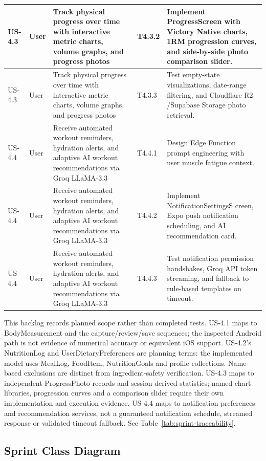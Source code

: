 \documentclass[12pt,a4paper,openany]{report}
\begin{document}
\begin{longtable}{|L{1.20cm}|L{2.00cm}|L{5.40cm}|L{1.80cm}|L{4.00cm}|}
US-4.3 & User & Track physical progress over time with interactive metric charts, volume graphs, and progress photos & T4.3.2 & Implement ProgressScreen with Victory Native charts, 1RM progression curves, and side-by-side photo comparison slider. \\ \hline
US-4.3 & User & Track physical progress over time with interactive metric charts, volume graphs, and progress photos & T4.3.3 & Test empty-state visualizations, date-range filtering, and Cloudflare R2 /Supabase Storage photo retrieval. \\ \hline
US-4.4 & User & Receive automated workout reminders, hydration alerts, and adaptive AI workout recommendations via Groq LLaMA-3.3 & T4.4.1 & Design Edge Function  prompt engineering with user muscle fatigue context. \\ \hline
US-4.4 & User & Receive automated workout reminders, hydration alerts, and adaptive AI workout recommendations via Groq LLaMA-3.3 & T4.4.2 & Implement NotificationSettingsS creen, Expo push notification scheduling, and AI recommendation card. \\ \hline
US-4.4 & User & Receive automated workout reminders, hydration alerts, and adaptive AI workout recommendations via Groq LLaMA-3.3 & T4.4.3 & Test notification permission handshakes, Groq API token streaming, and fallback to rule-based templates on timeout. \\ \hline
\end{longtable}
\endgroup

This backlog records planned scope rather than completed tests. US-4.1 maps to BodyMeasurement and the capture/review/save sequences; the inspected Android path is not evidence of numerical accuracy or equivalent iOS support. US-4.2's NutritionLog and UserDietaryPreferences are planning terms: the implemented model uses MealLog, FoodItem, NutritionGoals and profile collections. Name-based exclusions are distinct from ingredient-safety verification. US-4.3 maps to independent ProgressPhoto records and session-derived statistics; named chart libraries, progression curves and a comparison slider require their own implementation and execution evidence. US-4.4 maps to notification preferences and recommendation services, not a guaranteed notification schedule, streamed response or validated timeout fallback. See Table~\ref{tab:sprint-traceability}.

\subsection{Sprint Class Diagram}
\end{document}
